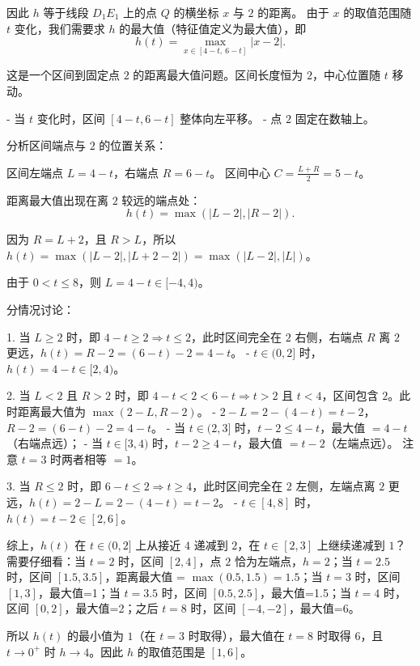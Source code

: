 因此 \(h\) 等于线段 \(D_1E_1\) 上的点 \(Q\) 的横坐标 \(x\) 与 \(2\) 的距离。  
由于 \(x\) 的取值范围随 \(t\) 变化，我们需要求 \(h\) 的最大值（特征值定义为最大值），即
\[
h(t) = \max_{x \in [4-t,\ 6-t]} |x - 2|.
\]

这是一个区间到固定点 \(2\) 的距离最大值问题。区间长度恒为 \(2\)，中心位置随 \(t\) 移动。

- 当 \(t\) 变化时，区间 \([4-t, 6-t]\) 整体向左平移。
- 点 \(2\) 固定在数轴上。

分析区间端点与 \(2\) 的位置关系：

区间左端点 \(L = 4-t\)，右端点 \(R = 6-t\)。  
区间中心 \(C = \frac{L+R}{2} = 5-t\)。

距离最大值出现在离 \(2\) 较远的端点处：
\[
h(t) = \max(|L-2|, |R-2|).
\]

因为 \(R = L+2\)，且 \(R > L\)，所以 \(h(t) = \max(|L-2|, |L+2-2|) = \max(|L-2|, |L|)\)。

由于 \(0 < t \le 8\)，则 \(L = 4-t \in [-4, 4)\)。

分情况讨论：

1. 当 \(L \ge 2\) 时，即 \(4-t \ge 2 \Rightarrow t \le 2\)，此时区间完全在 \(2\) 右侧，右端点 \(R\) 离 \(2\) 更远，\(h(t) = R-2 = (6-t)-2 = 4-t\)。
   - \(t \in (0,2]\) 时，\(h(t) = 4-t \in [2,4)\)。

2. 当 \(L < 2\) 且 \(R > 2\) 时，即 \(4-t < 2 < 6-t \Rightarrow t > 2\) 且 \(t < 4\)，区间包含 \(2\)。此时距离最大值为 \(\max(2-L, R-2)\)。
   - \(2-L = 2-(4-t)=t-2\)，\(R-2 = (6-t)-2 = 4-t\)。
   - 当 \(t \in (2,3]\) 时，\(t-2 \le 4-t\)，最大值 \(= 4-t\)（右端点远）；
   - 当 \(t \in [3,4)\) 时，\(t-2 \ge 4-t\)，最大值 \(= t-2\)（左端点远）。
   注意 \(t=3\) 时两者相等 \(=1\)。

3. 当 \(R \le 2\) 时，即 \(6-t \le 2 \Rightarrow t \ge 4\)，此时区间完全在 \(2\) 左侧，左端点离 \(2\) 更远，\(h(t) = 2 - L = 2-(4-t)=t-2\)。
   - \(t \in [4,8]\) 时，\(h(t) = t-2 \in [2,6]\)。

综上，\(h(t)\) 在 \(t \in (0,2]\) 上从接近 \(4\) 递减到 \(2\)，在 \(t \in [2,3]\) 上继续递减到 \(1\)？需要仔细看：当 \(t=2\) 时，区间 \([2,4]\)，点 \(2\) 恰为左端点，\(h=2\)；当 \(t=2.5\) 时，区间 \([1.5,3.5]\)，距离最大值 = \(\max(0.5,1.5)=1.5\)；当 \(t=3\) 时，区间 \([1,3]\)，最大值=1；当 \(t=3.5\) 时，区间 \([0.5,2.5]\)，最大值=1.5；当 \(t=4\) 时，区间 \([0,2]\)，最大值=2；之后 \(t=8\) 时，区间 \([-4,-2]\)，最大值=6。

所以 \(h(t)\) 的最小值为 \(1\)（在 \(t=3\) 时取得），最大值在 \(t=8\) 时取得 \(6\)，且 \(t \to 0^+\) 时 \(h \to 4\)。因此 \(h\) 的取值范围是 \([1, 6]\)。

